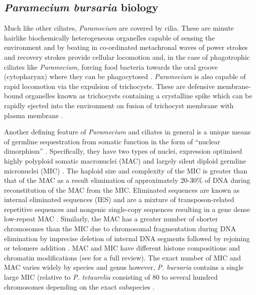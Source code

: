 \subsection{\textit{Paramecium bursaria} biology}
Much like other ciliates, \textit{Paramecium} are covered by cilia. 
These are minute hairlike biochemically heterogeneous organelles capable of sensing the environment and by
beating in co-ordinated metachronal waves of power strokes and recovery strokes \citep{Funfak2015} provide cellular locomotion and, 
in the case of phagotrophic ciliates like \textit{Paramecium}, forcing food bacteria towards
the oral groove (cytopharynx) where they can be phagocytosed \citep{Hamel2011,AubussonFleury2015}. %
\textit{Paramecium} is also capable of rapid locomotion via the expulsion of trichocysts.
These are defensive membrane-bound organelles known as trichocysts containing a crystalline spike which can be 
rapidly ejected into the environment on fusion of trichocyst membrane with plasma membrane \citep{Hamel2011}.

Another defining feature of \textit{Paramecium} and ciliates in general is a unique means of germline sequestration from somatic function 
in the form of ``nuclear dimorphism'' \citep{Jahn2002}.
Specifically, they have two types of nuclei, expression optimised highly polyploid somatic macronuclei (MAC)
and largely silent diploid germline micronuclei (MIC) \citep{Prescott1994}. 
The haploid size and complexity of the MIC is greater than that of the MAC as a result elimination of approximately 20-30\% of DNA during reconstitution
of the MAC from the MIC.  Eliminated sequences are known as internal eliminated sequences (IES) and are a mixture of transposon-related repetitive sequences 
and nongenic single-copy sequences resulting in a gene dense low-repeat MAC \citep{Kiefer2013}.   
Similarly, the MAC has a greater number of shorter chromosomes than the MIC due to chromosomal fragmentation during DNA elimination by imprecise
deletion of internal DNA segments followed by rejoining or telomere addition \citep{Kiefer2013}.
MAC and MIC have different histone compositions and chromatin modifications (see \citep{Kiefer2013} for a full review).
The exact number of MIC and MAC varies widely by species and genus however, \textit{P. bursaria}
contains a single large MIC (relative to \textit{P. tetaurelia} consisting of 80 to several hundred chromosomes depending
on the exact subspecies \citep{Chen1940}.  

